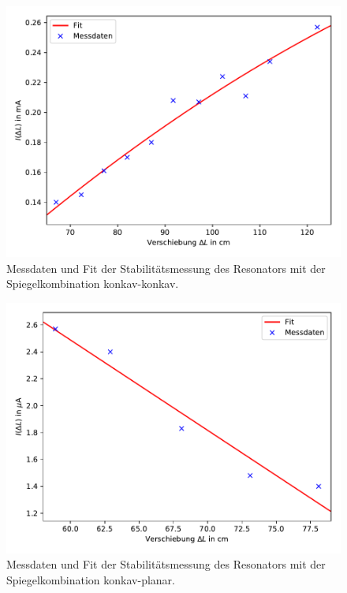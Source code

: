 \begin{figure}[h]
  \centering
  \includegraphics[width = \textwidth]{Pics/Stabilitaet_kk.pdf}
  \caption{Messdaten und Fit der Stabilitätsmessung des Resonators mit der Spiegelkombination konkav-konkav.}
  \label{fig:stabilität_quad}
\end{figure}

\begin{figure}[h]
  \centering
  \includegraphics[width = \textwidth]{Pics/Stabilitaet_kp.pdf}
  \caption{Messdaten und Fit der Stabilitätsmessung des Resonators mit der Spiegelkombination konkav-planar.}
  \label{fig:stabilität_lin}
\end{figure}


